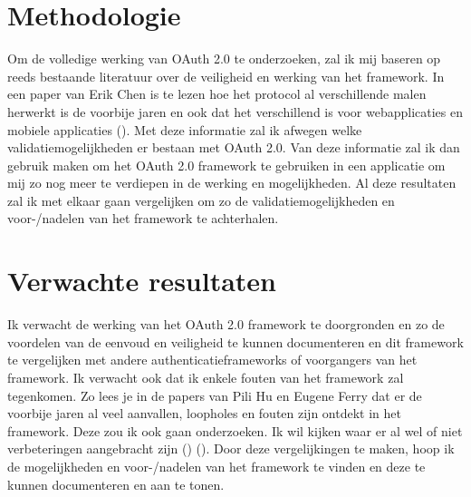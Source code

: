 

\section{Methodologie}
\label{sec:methodologie}

Om de volledige werking van OAuth 2.0 te onderzoeken, zal ik mij baseren op reeds bestaande literatuur over de veiligheid en werking van het framework. In een paper van Erik Chen is te lezen hoe het protocol al verschillende malen herwerkt is de voorbije jaren en ook dat het verschillend is voor webapplicaties en mobiele applicaties (\cite{Chen2014}). \newline 
Met deze informatie zal ik afwegen welke validatiemogelijkheden er bestaan met OAuth 2.0. Van deze informatie zal ik dan gebruik maken om het OAuth 2.0 framework te gebruiken in een applicatie om mij zo nog meer te verdiepen in de werking en mogelijkheden. Al deze resultaten zal ik met elkaar gaan vergelijken om zo de validatiemogelijkheden en voor-/nadelen van het framework te achterhalen.

\section{Verwachte resultaten}
\label{sec:verwachte_resultaten}

Ik verwacht de werking van het OAuth 2.0 framework te doorgronden en zo de voordelen van de eenvoud en veiligheid te kunnen documenteren en dit framework te vergelijken met andere authenticatieframeworks of voorgangers van het framework. Ik verwacht ook dat ik enkele fouten van het framework zal tegenkomen. Zo lees je in de papers van Pili Hu en Eugene Ferry dat er de voorbije jaren al veel aanvallen, loopholes en fouten zijn ontdekt in het framework. Deze zou ik ook gaan onderzoeken. Ik wil kijken waar er al wel of niet verbeteringen aangebracht zijn (\cite{Hu2014}) (\cite{Ferry2015}). \newline
Door deze vergelijkingen te maken, hoop ik de mogelijkheden en voor-/nadelen van het framework te vinden en deze te kunnen documenteren en aan te tonen. 

